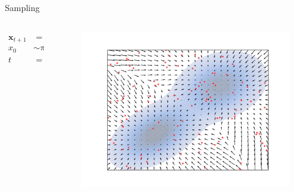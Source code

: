 \documentclass[aspectratio=169,xcolor=dvipsnames]{beamer}
\newcommand{\bx}{\mathbf{x}}
\begin{document}
\begin{frame}{Sampling}
  \begin{columns}
    \begin{column}{0.5\textwidth}
      \begin{align*}
        \bx_{t+1} &= \bx_{t} + \alpha \cdot s_\theta(\bx_t) \\
        x_0 &\sim \pi_{\text{init}}\\
        t &= 0, 1, \dots T \to \infty
      \end{align*}
    \end{column}
    \begin{column}{0.5\textwidth}
      \centering
      \begin{figure}
        \centering
        \includegraphics[width=\textwidth]{figs/gen/gaussian_mixture_score_init.png}
      \end{figure}
    \end{column}
  \end{columns}
\end{frame}
\end{document}
